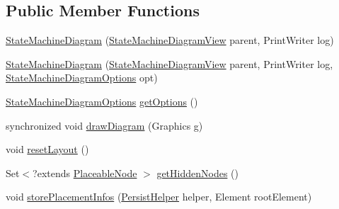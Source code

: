\subsection*{Public Member Functions}
\begin{DoxyCompactItemize}
\item 
\hyperlink{classorg_1_1tzi_1_1use_1_1gui_1_1views_1_1diagrams_1_1statemachine_1_1_state_machine_diagram_a51f50629580b7f9a1c419f3ea2237cda}{State\-Machine\-Diagram} (\hyperlink{classorg_1_1tzi_1_1use_1_1gui_1_1views_1_1diagrams_1_1statemachine_1_1_state_machine_diagram_view}{State\-Machine\-Diagram\-View} parent, Print\-Writer log)
\item 
\hyperlink{classorg_1_1tzi_1_1use_1_1gui_1_1views_1_1diagrams_1_1statemachine_1_1_state_machine_diagram_ac78c733a01b10d1c824136b7ef4eaaaa}{State\-Machine\-Diagram} (\hyperlink{classorg_1_1tzi_1_1use_1_1gui_1_1views_1_1diagrams_1_1statemachine_1_1_state_machine_diagram_view}{State\-Machine\-Diagram\-View} parent, Print\-Writer log, \hyperlink{classorg_1_1tzi_1_1use_1_1gui_1_1views_1_1diagrams_1_1statemachine_1_1_state_machine_diagram_options}{State\-Machine\-Diagram\-Options} opt)
\item 
\hyperlink{classorg_1_1tzi_1_1use_1_1gui_1_1views_1_1diagrams_1_1statemachine_1_1_state_machine_diagram_options}{State\-Machine\-Diagram\-Options} \hyperlink{classorg_1_1tzi_1_1use_1_1gui_1_1views_1_1diagrams_1_1statemachine_1_1_state_machine_diagram_a668424af93afa9e01204aec9e3c74e81}{get\-Options} ()
\item 
synchronized void \hyperlink{classorg_1_1tzi_1_1use_1_1gui_1_1views_1_1diagrams_1_1statemachine_1_1_state_machine_diagram_ace40fd410e27681718d720942493ec35}{draw\-Diagram} (Graphics g)
\item 
void \hyperlink{classorg_1_1tzi_1_1use_1_1gui_1_1views_1_1diagrams_1_1statemachine_1_1_state_machine_diagram_a2e0de00f47a549e11d96ecfa9c701864}{reset\-Layout} ()
\item 
Set$<$?extends \hyperlink{classorg_1_1tzi_1_1use_1_1gui_1_1views_1_1diagrams_1_1elements_1_1_placeable_node}{Placeable\-Node} $>$ \hyperlink{classorg_1_1tzi_1_1use_1_1gui_1_1views_1_1diagrams_1_1statemachine_1_1_state_machine_diagram_aa5a5851fcf2f99fbd45043ef32772a5d}{get\-Hidden\-Nodes} ()
\item 
void \hyperlink{classorg_1_1tzi_1_1use_1_1gui_1_1views_1_1diagrams_1_1statemachine_1_1_state_machine_diagram_ad0ed5ef691399d0e49e5d3a588b4de07}{store\-Placement\-Infos} (\hyperlink{classorg_1_1tzi_1_1use_1_1gui_1_1util_1_1_persist_helper}{Persist\-Helper} helper, Element root\-Element)

\end{DoxyCompactItemize}
